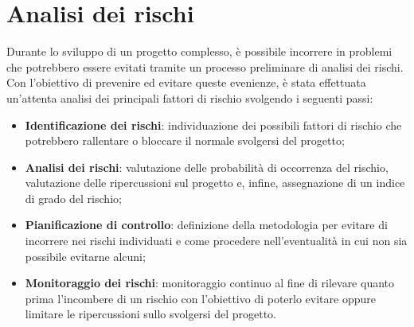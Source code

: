 \documentclass[../piano-di-progetto.tex]{subfiles}
\begin{document}
\section{Analisi dei rischi}
Durante lo sviluppo di un progetto complesso, è possibile incorrere in problemi che potrebbero essere evitati tramite un processo preliminare di analisi dei rischi. Con l'obiettivo di prevenire ed evitare queste evenienze, è stata effettuata un'attenta analisi dei principali fattori di rischio svolgendo i seguenti passi:

\begin{itemize}
    \item \textbf{Identificazione dei rischi}: individuazione dei possibili fattori di rischio che potrebbero rallentare o bloccare il normale svolgersi del progetto;
    \item \textbf{Analisi dei rischi}: valutazione delle probabilità di occorrenza del rischio, valutazione delle ripercussioni sul progetto e, infine, assegnazione di un indice di grado del rischio;
    \item \textbf{Pianificazione di controllo}: definizione della metodologia per evitare di incorrere nei rischi individuati e come procedere nell'eventualità in cui non sia possibile evitarne alcuni;
    \item \textbf{Monitoraggio dei rischi}: monitoraggio continuo al fine di rilevare quanto prima l'incombere di un rischio con l'obiettivo di poterlo evitare oppure limitare le ripercussioni sullo svolgersi del progetto.
\end{itemize}
\end{document}
